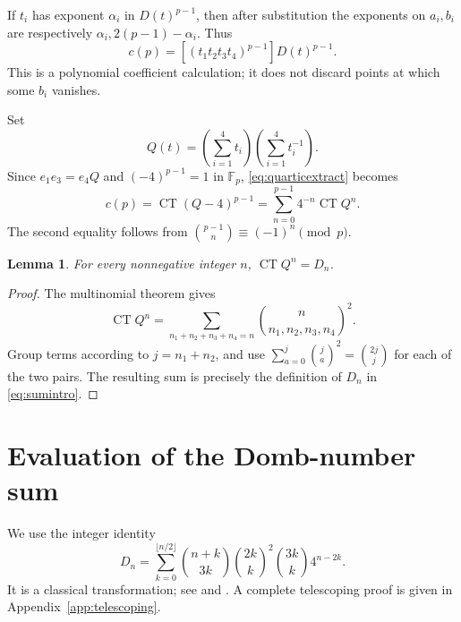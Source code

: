 \documentclass[11pt]{article}
\newtheorem{lemma}[theorem]{Lemma}
\theoremstyle{remark}\newtheorem{remark}[theorem]{Remark}
\DeclareMathOperator{\CT}{CT}
\newcommand{\F}{\mathbb F}
\numberwithin{equation}{section}
\begin{document}
If $t_i$ has exponent $\alpha_i$ in $D(t)^{p-1}$, then after
substitution the exponents on $a_i,b_i$ are respectively
$\alpha_i,2(p-1)-\alpha_i$. Thus
\begin{equation}\label{eq:quarticextract}
 c(p)=[(t_1t_2t_3t_4)^{p-1}]D(t)^{p-1}.
\end{equation}
This is a polynomial coefficient calculation; it does not discard
points at which some $b_i$ vanishes.

Set
\[
 Q(t)=\left(\sum_{i=1}^4t_i\right)
      \left(\sum_{i=1}^4t_i^{-1}\right).
\]
Since $e_1e_3=e_4Q$ and $(-4)^{p-1}=1$ in $\F_p$,
\eqref{eq:quarticextract} becomes
\begin{equation}\label{eq:ct}
 c(p)=\CT(Q-4)^{p-1}
     =\sum_{n=0}^{p-1}4^{-n}\CT Q^n.
\end{equation}
The second equality follows from
$\binom{p-1}{n}\equiv(-1)^n\pmod p$.

\begin{lemma}\label{lem:domb}
For every nonnegative integer $n$, $\CT Q^n=D_n$.
\end{lemma}
\begin{proof}
The multinomial theorem gives
\[
 \CT Q^n=\sum_{n_1+n_2+n_3+n_4=n}
             \binom{n}{n_1,n_2,n_3,n_4}^{\!2}.
\]
Group terms according to $j=n_1+n_2$, and use
$\sum_{a=0}^j\binom ja^2=\binom{2j}{j}$ for each of the two pairs.
The resulting sum is precisely the definition of $D_n$ in
\eqref{eq:sumintro}.
\end{proof}

\section{Evaluation of the Domb-number sum}
We use the integer identity
\begin{equation}\label{eq:transform}
 D_n=\sum_{k=0}^{\lfloor n/2\rfloor}
 \binom{n+k}{3k}\binom{2k}{k}^{\!2}\binom{3k}{k}4^{n-2k}.
\end{equation}
It is a classical transformation; see \cite[Lemma~3.1]{Sun} and
\cite[equation~(2.5)]{ML}. A complete telescoping proof is given in
Appendix~\ref{app:telescoping}.
\end{document}
